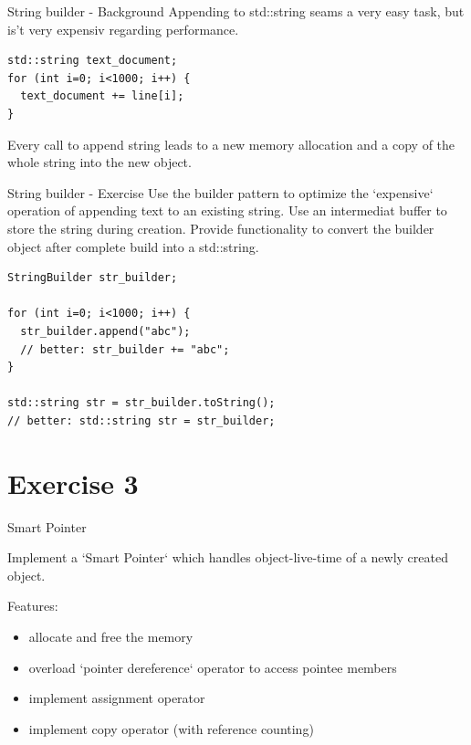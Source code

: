\documentclass{beamer}
\begin{document}
\begin{frame}[fragile]{String builder - Background}
Appending to std::string seams a very easy task, but is't very expensiv
regarding performance.

\begin{lstlisting}
std::string text_document;
for (int i=0; i<1000; i++) {
  text_document += line[i];
}
\end{lstlisting}

Every call to append string leads to a new memory allocation and a copy
of the whole string into the new object.
\end{frame}

\begin{frame}[fragile]{String builder - Exercise}
Use the builder pattern to optimize the `expensive` operation of appending text
to an existing string. Use an intermediat buffer to store the string during
creation. Provide functionality to convert the builder object after complete
build into a std::string.

\begin{lstlisting}
StringBuilder str_builder;

for (int i=0; i<1000; i++) {
  str_builder.append("abc");
  // better: str_builder += "abc";
}

std::string str = str_builder.toString();
// better: std::string str = str_builder;
\end{lstlisting}

\end{frame}

\section{Exercise 3}

\begin{frame}{Smart Pointer}
\subtitle{}
Implement a `Smart Pointer` which handles object-live-time of a newly created
object.
\par
Features:
\begin{itemize}
  \item allocate and free the memory
  \item overload `pointer dereference` operator to access pointee members
  \item implement assignment operator
  \item implement copy operator (with reference counting)
\end{itemize}

\end{frame}
\end{document}
